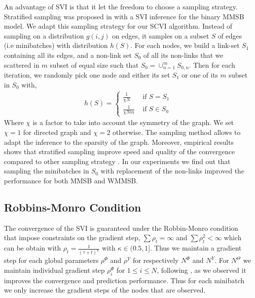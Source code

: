 An advantage of SVI is that it let the freedom to choose a sampling strategy. Stratified sampling was proposed in \cite{gopalan2013efficient} with a SVI inference for the binary MMSB model. We adapt this sampling strategy for our SCVI algorithm. Instead of sampling on a distribution $g(i,j)$ on edges, it samples on a subset $S$ of edges (i.e minibatches) with distribution $h(S)$. For each nodes, we build a link-set $S_1$ containing all its edges, and a non-link set $S_0$ of all its non-links that we scattered in $m$ subset of equal size such that $S_0 = \cup_{n=1}^m S_{0,n}$. Then for each iteration, we randomly pick one node and either its set $S_1$ or one of its $m$ subset in $S_0$ with,
\begin{align*}
h(S)=\begin{cases}
    \frac{1}{\chi N}  & \textrm{ if } S = S_1 \\
    \frac{1}{\chi N m}  & \textrm{ if } S \in S_0 
    \end{cases}
\end{align*}
Where $\chi$ is a factor to take into account the symmetry of the graph. We set $\chi=1$ for directed graph and $\chi=2$ otherwise. The sampling method allows to adapt the inference to the sparsity of the graph. Moreover, empirical results shows that stratified sampling improve speed and quality of the convergence compared to other sampling strategy \cite{gopalan2013efficient}\cite{kim2013efficient}. In our experiments we find out that sampling the minibatches in $S_0$ with replacement of the non-links improved the performance for both MMSB and WMMSB.

\subsection{Robbins-Monro Condition}

The convergence of the SVI is guaranteed under the Robbin-Monro condition \cite{robbins1951stochastic} that impose constraints on the gradient step, $\sum \rho_t = \infty$ and $\sum \rho_t^2 < \infty$ which can be obtain with $\rho_t = \frac{1}{(\tau +t)^\kappa}$ with $\kappa \in (0.5, 1]$. Thus we maintain a gradient step for each global parameters $\rho^\Phi$ and $\rho^Y$ for respectively  $N^\Phi$ and $N^Y$. For $N^\Theta$ we maintain individual gradient step $\rho_i^{\Phi}$ for $1\leq i\leq N$, following \cite{miller2009nonparametric}, as we observed it improves the convergence and prediction performance. Thus for each minibatch we only increase the gradient steps of the nodes that are observed.

